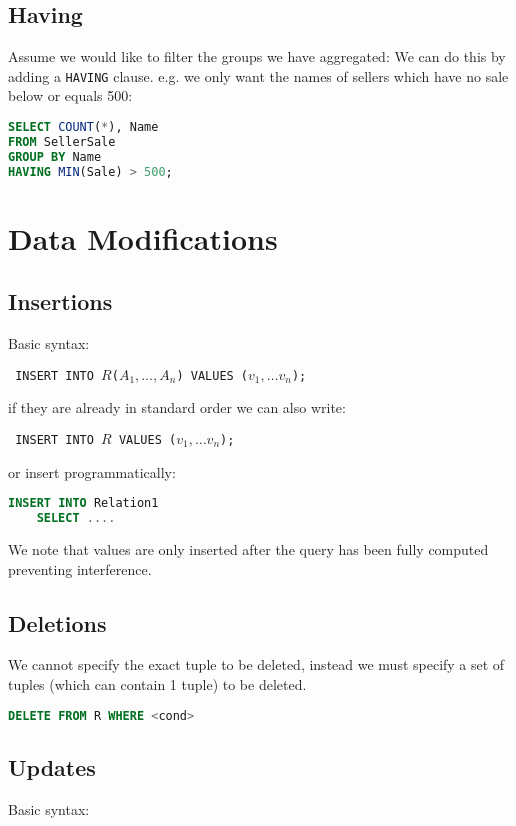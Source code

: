 \documentclass{sciposter}
\renewcommand{\t}[1]{\texttt{#1}}
\begin{document}
\begin{multicols}{3}
\subsection*{Having}

Assume we would like to filter the groups we have aggregated: We can do this by adding a \t{HAVING} clause. e.g. we only want the names of sellers which have no sale below or equals 500:

\begin{lstlisting}[language=SQL]
SELECT COUNT(*), Name
FROM SellerSale
GROUP BY Name
HAVING MIN(Sale) > 500;
\end{lstlisting}


\section*{Data Modifications}

\subsection*{Insertions}

Basic syntax:

\texttt{
INSERT INTO $R$($A_1,\ldots,A_n$) VALUES ($v_1,\ldots v_n$);
}

if they are already in standard order we can also write:

\texttt{
	INSERT INTO $R$ VALUES ($v_1,\ldots v_n$);
}

or insert programmatically:

\begin{lstlisting}[language=SQL]
INSERT INTO Relation1
	SELECT ....
\end{lstlisting}

We note that values are only inserted after the query has been fully computed preventing interference.

\subsection*{Deletions}
We cannot specify the exact tuple to be deleted, instead we must specify a set of tuples (which can contain 1 tuple) to be deleted.
\begin{lstlisting}[language=SQL]
DELETE FROM R WHERE <cond>
\end{lstlisting}

\subsection*{Updates}
Basic syntax:


\end{multicols}
\end{document}
